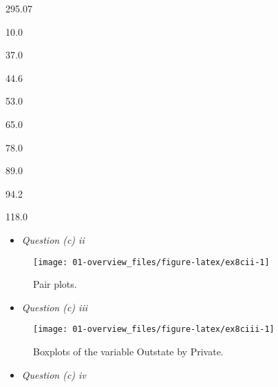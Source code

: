 \documentclass[]{book}
\newenvironment{Shaded}{\begin{snugshade}}{\end{snugshade}}
\newcommand{\DataTypeTok}[1]{\textcolor[rgb]{0.13,0.29,0.53}{#1}}
\newcommand{\DecValTok}[1]{\textcolor[rgb]{0.00,0.00,0.81}{#1}}
\newcommand{\KeywordTok}[1]{\textcolor[rgb]{0.13,0.29,0.53}{\textbf{#1}}}
\newcommand{\NormalTok}[1]{#1}
\newcommand{\OperatorTok}[1]{\textcolor[rgb]{0.81,0.36,0.00}{\textbf{#1}}}
\newcommand{\StringTok}[1]{\textcolor[rgb]{0.31,0.60,0.02}{#1}}
\providecommand{\tightlist}{%
  \setlength{\itemsep}{0pt}\setlength{\parskip}{0pt}}
\begin{document}
295.07

10.0

37.0

44.6

53.0

65.0

78.0

89.0

94.2

118.0

\begin{itemize}
\tightlist
\item
  \emph{Question (c) ii}
\end{itemize}

\begin{figure}

{\centering \texttt{[image: 01-overview\_files/figure-latex/ex8cii-1]} 

}

\caption{Pair plots.}\label{fig:ex8cii}
\end{figure}

\begin{itemize}
\tightlist
\item
  \emph{Question (c) iii}
\end{itemize}

\begin{figure}

{\centering \texttt{[image: 01-overview\_files/figure-latex/ex8ciii-1]} 

}

\caption{Boxplots of the variable Outstate by Private.}\label{fig:ex8ciii}
\end{figure}

\begin{itemize}
\tightlist
\item
  \emph{Question (c) iv}
\end{itemize}

\begin{Shaded}
\end{Shaded}

\begin{Shaded}
\end{Shaded}
\end{document}
